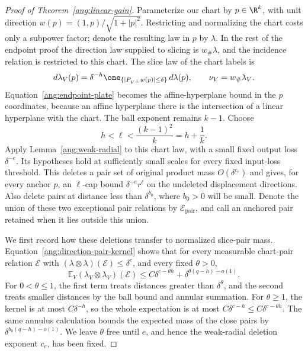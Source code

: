 \begin{proof}[Proof of Theorem~\ref{ang:linear-gain}]
Parameterize our chart by $p\in\R^k$, with unit direction
$w(p)=(1,p)/\sqrt{1+|p|^2}$. Restricting and normalizing the chart
costs only a subpower factor; denote the resulting law in $p$ by
$\lambda$. In the rest of the endpoint proof the direction law supplied
to slicing is $w_\#\lambda$, and the incidence relation is restricted to
this chart. The slice law of the chart labels is
\[
 d\lambda_V(p)=\delta^{-h}
 \one_{\{|P_{V^\perp}w(p)|\le\delta\}}\,d\lambda(p),
 \qquad \nu_V=w_\#\lambda_V.
\]
Equation~\eqref{ang:endpoint-plate}
becomes the affine-hyperplane bound in the $p$ coordinates, because
an affine hyperplane there is the intersection of a linear hyperplane
with the chart. The ball exponent remains $k-1$. Choose
\[
 h<\ell<\frac{(k-1)^2}{k}=h+\frac1k.
\]
Apply Lemma~\ref{ang:weak-radial} to this chart law, with a small
fixed output loss $\delta^{-e}$. Its hypotheses hold at sufficiently
small scales for every fixed input-loss threshold. This deletes a
pair set of original product mass $O(\delta^{c_e})$ and gives, for
every anchor $p$, an $\ell$-cap bound $\delta^{-e}r^\ell$ on
the undeleted displacement directions. Also delete pairs at distance
less than $\delta^{b_0}$, where $b_0>0$ will be small. Denote the union
of these two exceptional pair relations by $\mathcal E_{\mathrm{pair}}$,
and call an anchored pair retained when it lies outside this union.

We first record how these deletions transfer to normalized slice-pair
mass. Equation~\eqref{ang:direction-pair-kernel}
shows that for every measurable chart-pair relation $\mathcal E$ with
$(\lambda\otimes\lambda)(\mathcal E)\le\delta^c$, and every fixed
$\theta>0$,
\begin{equation}\label{ang:exceptional-pair-transfer}
 \mathbb E_V(\lambda_V\otimes\lambda_V)(\mathcal E)
 \le C\delta^{c-\theta h}
       +\delta^{\theta(q-h)-o(1)}.
\end{equation}
For $0<\theta\le1$, the first term treats distances greater than
$\delta^\theta$, and the second treats smaller distances by the ball
bound and annular summation. For $\theta\ge1$, the kernel is at most
$C\delta^{-h}$, so the whole expectation is at most
$C\delta^{c-h}\le C\delta^{c-\theta h}$. The same annulus calculation
bounds the expected mass of the close pairs by
$\delta^{b_0(q-h)-o(1)}$. We leave $\theta$ free until $e$, and hence
the weak-radial deletion exponent $c_e$, has been fixed.


\end{proof}
